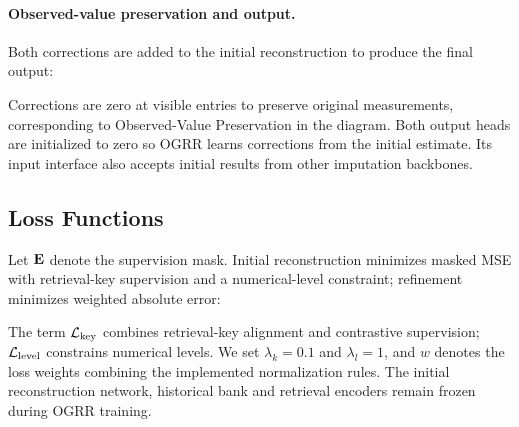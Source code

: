 \paragraph{Observed-value preservation and output.}
Both corrections are added to the initial reconstruction to produce the final output:

Corrections are zero at visible entries to preserve original measurements, corresponding to Observed-Value Preservation in the diagram. Both output heads are initialized to zero so OGRR learns corrections from the initial estimate. Its input interface also accepts initial results from other imputation backbones.

\subsection{Loss Functions}\label{sec:loss}
Let $\mathbf{E}$ denote the supervision mask. Initial reconstruction minimizes masked MSE with retrieval-key supervision and a numerical-level constraint; refinement minimizes weighted absolute error:

The term $\mathcal L_{\rm key}$ combines retrieval-key alignment and contrastive supervision; $\mathcal L_{\rm level}$ constrains numerical levels. We set $\lambda_k=0.1$ and $\lambda_l=1$, and $w$ denotes the loss weights combining the implemented normalization rules. The initial reconstruction network, historical bank and retrieval encoders remain frozen during OGRR training.
